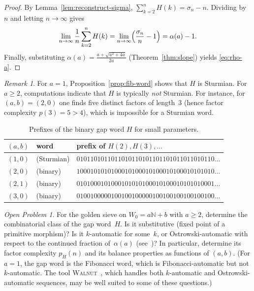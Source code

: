 \documentclass[11pt]{article}
\numberwithin{equation}{section}
\theoremstyle{plain}
\theoremstyle{definition}
\theoremstyle{remark}
\newtheorem{remark}[theorem]{Remark}
\newtheorem{openproblem}[theorem]{Open Problem}
\newcommand{\N}{\mathbb{N}}
\begin{document}
\begin{proof}
By Lemma~\ref{lem:reconstruct-sigma},
$\sum_{k=2}^{n}H(k)=\sigma_n-n$. Dividing by $n$ and letting $n\to\infty$
gives
\[
  \lim_{n\to\infty}\frac1n\sum_{k=2}^{n}H(k)
  =\lim_{n\to\infty}\Bigl(\frac{\sigma_n}{n}-1\Bigr)=\alpha(a)-1.
\]
Finally, substituting $\alpha(a)=\frac{a+\sqrt{a^2+4a}}{2a}$
(Theorem~\ref{thm:slope}) yields \eqref{eq:rho-a}.
\end{proof}

\begin{remark}
For $a=1$, Proposition~\ref{prop:fib-word} shows that $H$ is Sturmian.
For $a\ge2$, computations indicate that $H$ is typically \emph{not}
Sturmian. For instance, for $(a,b)=(2,0)$ one finds five distinct factors
of length~$3$ (hence factor complexity $p(3)=5>4$), which is impossible
for a Sturmian word.
\end{remark}

\begin{table}[t]
\centering
\begin{tabular}{@{}llp{}@{}}
\toprule
$(a,b)$ & word & prefix of $H(2),H(3),\ldots$ \\ \midrule
$(1,0)$ & (Sturmian) & $0101101011011010110101101101011011010110\ldots$ \\
$(2,0)$ & (binary)   & $1000101010100010100010100010100010101010\ldots$ \\
$(2,1)$ & (binary)   & $0101000101000101010100010100010101010001\ldots$ \\
$(3,0)$ & (binary)   & $0100100000100100100000100100100100100100\ldots$ \\
\bottomrule
\end{tabular}
\caption{Prefixes of the binary gap word $H$ for small parameters.}
\label{tab:gapword-prefix}
\end{table}

\begin{openproblem}\label{op:gapword}
For the golden sieve on $W_0=a\N+b$ with $a\ge2$, determine the
combinatorial class of the gap word~$H$.  Is it substitutive (fixed
point of a primitive morphism)?  Is it $k$-automatic for some~$k$, or
Ostrowski-automatic with respect to the continued fraction
of~$\alpha(a)$ (see~\cite{BSS2021})?  In particular, determine its factor complexity
$p_H(n)$ and its balance properties as functions of $(a,b)$.  (For
$a=1$, the gap word is the Fibonacci word, which is
Fibonacci-automatic but not $k$-automatic.
The tool \textsc{Walnut}~\cite{Shallit2022walnut}, which handles both
$k$-automatic and Ostrowski-automatic sequences, may be well suited
to some of these questions.)
\end{openproblem}
\end{document}
